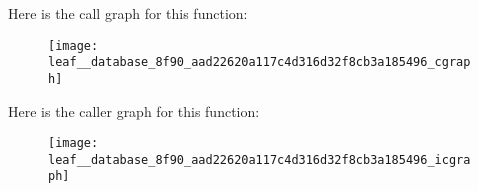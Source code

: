 Here is the call graph for this function\+:\nopagebreak
\begin{figure}[H]
\begin{center}
\leavevmode
\texttt{[image: leaf\_\_database\_8f90\_aad22620a117c4d316d32f8cb3a185496\_cgraph]}
\end{center}
\end{figure}




Here is the caller graph for this function\+:\nopagebreak
\begin{figure}[H]
\begin{center}
\leavevmode
\texttt{[image: leaf\_\_database\_8f90\_aad22620a117c4d316d32f8cb3a185496\_icgraph]}
\end{center}
\end{figure}


